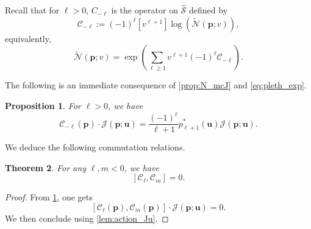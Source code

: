 \documentclass[12pt]{amsart}
\newtheorem{thm}{Theorem}[section]
\newtheorem{prop}[thm]{Proposition}
\theoremstyle{remark}
\newcommand{\bfp}{\boldsymbol{p}}
\newcommand{\bfu}{\boldsymbol{u}}
\newcommand{\C}{\mathcal C}
\newcommand{\mcJ}{\mathcal{J}}
\newcommand{\mcSh}{\widehat{\mathcal{S}}}
\newcommand{\tN}{{\mathcal{\widetilde N}}}
\begin{document}
Recall that for $\ell>0$, $C_{-\ell}$  is the operator on $\mcSh$ defined by
\begin{equation}\label{eq:neg_Cl}
  \C_{-\ell}:=(-1)^\ell\left[v^{\ell+1}\right]\log\left(\tN(\bfp;v)\right),
\end{equation}
equivalently,
$$\tN(\bfp;v)=\exp\left(\sum_{\ell\geq 1} v^{\ell+1}(-1)^\ell\C_{-\ell}\right).$$


The following is an immediate consequence of \cref{prop:N_mcJ} and \cref{eq:pleth_exp}.

\begin{prop}\label{prop:C_negative_mcJ}
    For $\ell>0$, we have 
    $$\C_{-\ell}(\bfp)\cdot \mcJ(\bfp;\bfu)=\frac{(-1)^\ell }{\ell+1}p^*_{\ell+1}(\bfu)\mcJ(\bfp;\bfu).$$
\end{prop}


We deduce the following commutation relations.
\begin{thm}\label{thm:comm_rel_neg}
    For any $\ell,m<0$, we have
    $$\left[\C_\ell,\C_m\right]=0.$$
\end{thm}
\begin{proof}
    From \cref{prop:C_negative_mcJ}, one gets
    $$\left[\C_\ell(\bfp),\C_m(\bfp)\right]\cdot \mcJ(\bfp;\bfu)=0.$$
    We then conclude using \cref{lem:action_Ju}.
\end{proof}
\end{document}
